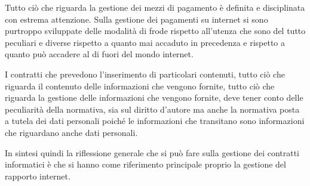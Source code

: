 Tutto ciò che riguarda la gestione dei mezzi di pagamento è definita e disciplinata con estrema attenzione. Sulla gestione dei pagamenti su internet si sono purtroppo sviluppate delle modalità di frode rispetto all'utenza che sono del tutto peculiari e diverse rispetto a quanto mai accaduto in precedenza e rispetto a quanto può accadere al di fuori del mondo internet. 

I contratti che prevedono l'inserimento di particolari contenuti, tutto ciò che riguarda il contenuto delle informazioni che vengono fornite, tutto ciò che riguarda la gestione delle informazioni che vengono fornite, deve tener conto delle peculiarità della normativa, sia sul diritto d'autore ma anche la normativa posta a tutela dei dati personali poiché le informazioni che transitano sono informazioni che riguardano anche dati personali. 

In sintesi quindi la riflessione generale che si può fare sulla gestione dei contratti informatici è che si hanno come riferimento principale proprio la gestione del rapporto internet.